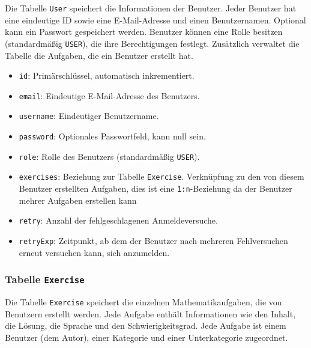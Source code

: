 \documentclass[12pt,a4paper]{article} %
\begin{document}
Die Tabelle \texttt{User} speichert die Informationen der Benutzer. Jeder Benutzer hat eine eindeutige ID sowie eine E-Mail-Adresse und einen Benutzernamen. Optional kann ein Passwort gespeichert werden. Benutzer können eine Rolle besitzen (standardmäßig \texttt{USER}), die ihre Berechtigungen festlegt. Zusätzlich verwaltet die Tabelle die Aufgaben, die ein Benutzer erstellt hat.

\begin{itemize}
  \item \texttt{id}: Primärschlüssel, automatisch inkrementiert.
  \item \texttt{email}: Eindeutige E-Mail-Adresse des Benutzers.
  \item \texttt{username}: Eindeutiger Benutzername.
  \item \texttt{password}: Optionales Passwortfeld, kann null sein.
  \item \texttt{role}: Rolle des Benutzers (standardmäßig \texttt{USER}).
  \item \texttt{exercises}: Beziehung zur Tabelle \texttt{Exercise}. Verknüpfung zu den von diesem Benutzer erstellten Aufgaben, dies ist eine \texttt{1:n}-Beziehung da der Benutzer mehrer Aufgaben erstellen kann
  \item \texttt{retry}: Anzahl der fehlgeschlagenen Anmeldeversuche.
  \item \texttt{retryExp}: Zeitpunkt, ab dem der Benutzer nach mehreren Fehlversuchen erneut versuchen kann, sich anzumelden.
\end{itemize}

\subsubsection{Tabelle \texttt{Exercise}}

Die Tabelle \texttt{Exercise} speichert die einzelnen Mathematikaufgaben, die von Benutzern erstellt werden. Jede Aufgabe enthält Informationen wie den Inhalt, die Lösung, die Sprache und den Schwierigkeitsgrad. Jede Aufgabe ist einem Benutzer (dem Autor), einer Kategorie und einer Unterkategorie zugeordnet.
\end{document}
